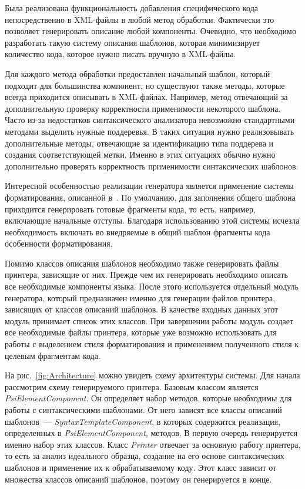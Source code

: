 Была реализована функциональность добавления специфического кода непосредственно в XML-файлы в любой метод обработки. Фактически это позволяет генерировать описание любой компоненты. Очевидно, что необходимо разработать такую систему описания шаблонов, которая минимизирует количество кода, которое нужно писать вручную в XML-файлы. 

Для каждого метода обработки предоставлен начальный шаблон, который подходит для большинства компонент, но существуют также методы, которые всегда приходится описывать в XML-файлах. Например, метод отвечающий за дополнительную проверку корректности применимости некоторого шаблона. Часто из-за недостатков синтаксического анализатора невозможно стандартными методами выделить нужные поддеревья. В таких ситуация нужно реализовывать дополнительные методы, отвечающие за идентификацию типа поддерева и создания соответствующей метки. Именно в этих ситуациях обычно нужно дополнительно проверять корректность применимости синтаксических шаблонов.

Интересной особенностью реализации генератора является применение системы форматирования, описанной в~\cite{podkopaev:diploma}. По умолчанию, для заполнения общего шаблона приходится генерировать готовые фрагменты кода, то есть, например, включающие начальные отступы. Благодаря использованию этой системы исчезла необходимость включать во внедряемые в общий шаблон фрагменты кода особенности форматирования.

Помимо классов описания шаблонов необходимо также генерировать файлы принтера, зависящие от них. Прежде чем их генерировать необходимо описать все необходимые компоненты языка. После этого используется отдельный модуль генератора, который предназначен именно для генерации файлов принтера, зависящих от классов описаний шаблонов. В качестве входных данных этот модуль принимает список этих классов. При завершении работы модуль создает все необходимые файлы принтера, которые уже возможно использовать для работы с выделением стиля форматирования и применением полученного стиля к целевым фрагментам кода.

На рис.~\ref{fig:Architecture} можно увидеть схему архитектуры системы. Для начала рассмотрим схему генерируемого принтера. Базовым классом является \textit{PsiElementComponent}. Он определяет набор методов, которые необходимы для работы с синтаксическими шаблонами. От него зависят все классы описаний шаблонов~--- \textit{SyntaxTemplateComponent}, в которых содержится реализация, определенных в \textit{PsiElementComponent}, методов. В первую очередь генерируется именно набор этих классов. Класс \textit{Printer} отвечает за основную работу принтера, то есть за анализ идеального образца, создание на его основе синтаксических шаблонов и применение их к обрабатываемому коду. Этот класс зависит от множества классов описаний шаблонов, поэтому он генерируется в конце.

